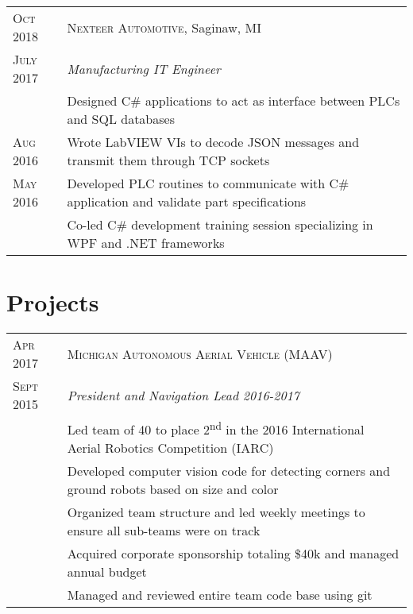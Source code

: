 \documentclass[a4paper,12pt]{article} %
\begin{document}

\begin{tabular}{R{2.1cm}|p{14cm}}
\textsc{Oct 2018} & \textsc{Nexteer Automotive}, Saginaw, MI \\
\textsc{July 2017} & \emph{Manufacturing IT Engineer} \\
& \footnotesize{Designed C\# applications to act as interface
  between PLCs and SQL databases} \\
\textsc{Aug 2016} & \footnotesize{Wrote LabVIEW VIs to decode JSON messages
  and transmit them through TCP sockets}\\
\textsc{May 2016} & \footnotesize{Developed PLC routines to communicate with C\#
  application and validate part specifications} \\
& \footnotesize{Co-led C\# development training session specializing in WPF and
 .NET frameworks}\\
\end{tabular}


\section{Projects}

\begin{tabular}{R{2.1cm}|p{14cm}}
\textsc{Apr 2017} & \textsc{Michigan Autonomous Aerial Vehicle (MAAV)} \\
\textsc{Sept 2015} & \emph{President and Navigation Lead 2016-2017} \\
& \footnotesize{Led team of 40 to place 2\textsuperscript{nd} in the 2016
  International Aerial Robotics Competition (IARC)} \\
& \footnotesize{Developed computer vision code for detecting corners and
  ground robots based on size and color} \\
& \footnotesize{Organized team structure and led weekly meetings to ensure all
  sub-teams were on track} \\
& \footnotesize{Acquired corporate sponsorship totaling \$40k and managed annual
  budget} \\
& \footnotesize{Managed and reviewed entire team code base using git} \\
\end{tabular}
\end{document}
